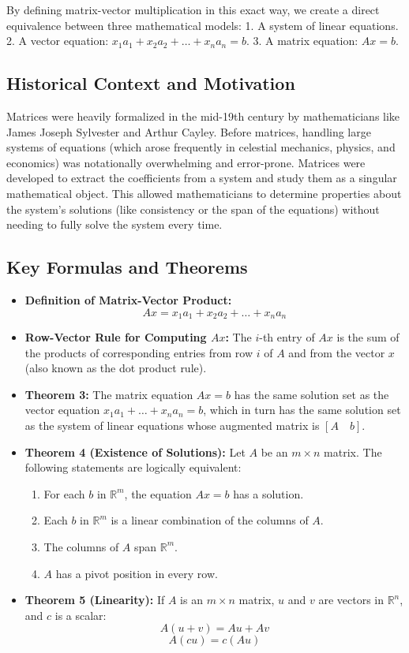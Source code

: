 \documentclass{article}
\begin{document}
By defining matrix-vector multiplication in this exact way, we create a direct equivalence between three mathematical models:
1. A system of linear equations.
2. A vector equation: $x_1a_1 + x_2a_2 + \dots + x_na_n = b$.
3. A matrix equation: $Ax = b$.

\subsection{Historical Context and Motivation}
Matrices were heavily formalized in the mid-19th century by mathematicians like James Joseph Sylvester and Arthur Cayley. Before matrices, handling large systems of equations (which arose frequently in celestial mechanics, physics, and economics) was notationally overwhelming and error-prone. Matrices were developed to extract the coefficients from a system and study them as a singular mathematical object. This allowed mathematicians to determine properties about the system's solutions (like consistency or the span of the equations) without needing to fully solve the system every time. 

\subsection{Key Formulas and Theorems}
\begin{itemize}
    \item \textbf{Definition of Matrix-Vector Product:} 
    \[ Ax = x_1a_1 + x_2a_2 + \dots + x_na_n \]
    \item \textbf{Row-Vector Rule for Computing $Ax$:} The $i$-th entry of $Ax$ is the sum of the products of corresponding entries from row $i$ of $A$ and from the vector $x$ (also known as the dot product rule).
    \item \textbf{Theorem 3:} The matrix equation $Ax = b$ has the same solution set as the vector equation $x_1a_1 + \dots + x_na_n = b$, which in turn has the same solution set as the system of linear equations whose augmented matrix is $[A \quad b]$.
    \item \textbf{Theorem 4 (Existence of Solutions):} Let $A$ be an $m \times n$ matrix. The following statements are logically equivalent:
    \begin{enumerate}
        \item For each $b$ in $\mathbb{R}^m$, the equation $Ax = b$ has a solution.
        \item Each $b$ in $\mathbb{R}^m$ is a linear combination of the columns of $A$.
        \item The columns of $A$ span $\mathbb{R}^m$.
        \item $A$ has a pivot position in every row.
    \end{enumerate}
    \item \textbf{Theorem 5 (Linearity):} If $A$ is an $m \times n$ matrix, $u$ and $v$ are vectors in $\mathbb{R}^n$, and $c$ is a scalar:
    \[ A(u + v) = Au + Av \]
    \[ A(cu) = c(Au) \]
\end{itemize}
\end{document}
